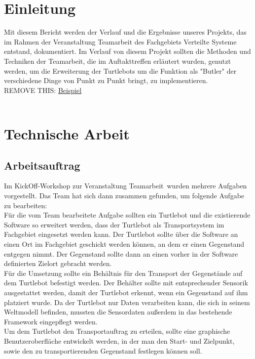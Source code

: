 \documentclass[a4paper,12pt,headsepline]{scrartcl}
\begin{document}
	\tableofcontents
	\newpage
	
	\section{Einleitung}
		Mit diesem Bericht werden der Verlauf und die Ergebnisse unseres Projekts, das im Rahmen der Veranstaltung Teamarbeit des Fachgebiets Verteilte Systeme entstand, dokumentiert.
Im Verlauf von diesem Projekt sollten die Methoden und Techniken der Teamarbeit, die im Auftakttreffen erläutert wurden, genutzt werden, um die Erweiterung der
Turtlebots um die Funktion als "Butler" der verschiedene Dinge von Punkt zu Punkt bringt, zu implementieren.\\
		REMOVE THIS: \href{https://docs.google.com/document/d/1wGlFley6lwhnpLsj8ms7M6fnOjplazlHNr8Bfbv3vso/edit}{Beispiel}\\\\
	\newpage
	\section{Technische Arbeit}
	
	\subsection{Arbeitsauftrag}
		Im KickOff-Workshop zur Veranstaltung \glqq Teamarbeit\grqq\ wurden mehrere Aufgaben vorgestellt. Das Team hat sich dann zusammen gefunden, um folgende Aufgabe zu bearbeiten: \\
		Für die vom Team bearbeitete Aufgabe sollten ein Turtlebot und die existierende Software so erweitert werden, dass der Turtlebot als Transportsystem im Fachgebiet eingesetzt werden kann. Der Turtlebot sollte über die Software an einen Ort im Fachgebiet geschickt werden können, an dem er einen Gegenstand entgegen nimmt. Der Gegenstand sollte dann an einen vorher in der Software definierten Zielort gebracht werden. \\
		Für die Umsetzung sollte ein Behältnis  für den Transport der Gegenstände auf dem Turtlebot befestigt werden. Der Behälter sollte mit entsprechender Sensorik ausgestattet werden, damit der Turtlebot erkennt, wenn ein Gegenstand auf ihm platziert wurde. Da der Turtlebot nur Daten verarbeiten kann, die sich in seinem Weltmodell befinden, mussten die Sensordaten außerdem in das bestehende Framework eingepflegt werden.\\
		Um dem Turtlebot den Transportauftrag zu erteilen, sollte eine graphische Benutzeroberfläche entwickelt werden, in der man den Start- und Zielpunkt, sowie den zu transportierenden Gegenstand festlegen können soll.  
\end{document}
